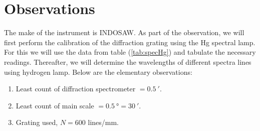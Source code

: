 \documentclass[%
 reprint,
 amsmath,amssymb,
 aps,
]{revtex4-2}
\begin{document}
\section{Observations}
    The make of the instrument is INDOSAW. As part of the observation, we will first perform the calibration of the diffraction grating using the Hg spectral lamp. For this we will use the data from table (\ref{tab:specHg}) and tabulate the necessary readings. Thereafter, we will determine the wavelengths of different spectra lines using hydrogen lamp. Below are the elementary observations:
    \begin{enumerate}
        \item Least count of diffraction spectrometer $= \SI{0.5}{\arcminute}$.
        \item Least count of main scale $= \SI{0.5}{\degree} = \SI{30}{\arcminute}$.
        \item Grating used, $N = 600$ lines/mm.
    \end{enumerate}
\end{document}
